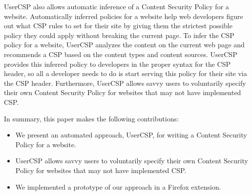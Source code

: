 UserCSP also allows automatic inference of a Content Security Policy
for a website. Automatically inferred policies for a website help web
developers figure out what CSP rules to set for their site by giving
them the strictest possible policy they could apply without breaking
the current page.  To infer the CSP policy for a website, UserCSP
analyzes the content on the current web page and recommends a CSP
based on the content types and content sources. UserCSP provides this
inferred policy to developers in the proper syntax for the CSP header,
so all a developer needs to do is start serving this policy for their
site via the CSP header.  Furthermore, UserCSP allows
savvy users to voluntarily specify their own Content Security Policy
for websites that may not have implemented CSP.

In summary, this paper makes the following contributions:

\begin {itemize}

\item We present an automated approach, UserCSP, for writing a Content
  Security Policy for a website.

\item UserCSP allows savvy users to voluntarily specify their own
  Content Security Policy for websites that may not have implemented
  CSP.

\item We implemented a prototype of our approach in a Firefox
  extension.

\end{itemize}
